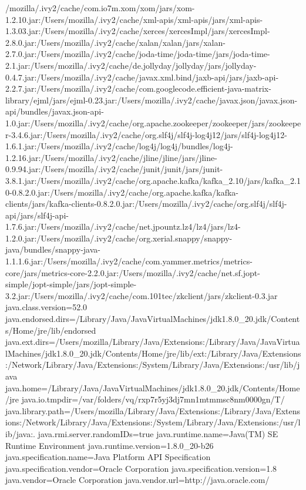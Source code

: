 /mozilla/.ivy2/cache/com.io7m.xom/xom/jars/xom-1.2.10.jar:/Users/mozilla/.ivy2/cache/xml-apis/xml-apis/jars/xml-apis-1.3.03.jar:/Users/mozilla/.ivy2/cache/xerces/xercesImpl/jars/xercesImpl-2.8.0.jar:/Users/mozilla/.ivy2/cache/xalan/xalan/jars/xalan-2.7.0.jar:/Users/mozilla/.ivy2/cache/joda-time/joda-time/jars/joda-time-2.1.jar:/Users/mozilla/.ivy2/cache/de.jollyday/jollyday/jars/jollyday-0.4.7.jar:/Users/mozilla/.ivy2/cache/javax.xml.bind/jaxb-api/jars/jaxb-api-2.2.7.jar:/Users/mozilla/.ivy2/cache/com.googlecode.efficient-java-matrix-library/ejml/jars/ejml-0.23.jar:/Users/mozilla/.ivy2/cache/javax.json/javax.json-api/bundles/javax.json-api-1.0.jar:/Users/mozilla/.ivy2/cache/org.apache.zookeeper/zookeeper/jars/zookeeper-3.4.6.jar:/Users/mozilla/.ivy2/cache/org.slf4j/slf4j-log4j12/jars/slf4j-log4j12-1.6.1.jar:/Users/mozilla/.ivy2/cache/log4j/log4j/bundles/log4j-1.2.16.jar:/Users/mozilla/.ivy2/cache/jline/jline/jars/jline-0.9.94.jar:/Users/mozilla/.ivy2/cache/junit/junit/jars/junit-3.8.1.jar:/Users/mozilla/.ivy2/cache/org.apache.kafka/kafka_2.10/jars/kafka_2.10-0.8.2.0.jar:/Users/mozilla/.ivy2/cache/org.apache.kafka/kafka-clients/jars/kafka-clients-0.8.2.0.jar:/Users/mozilla/.ivy2/cache/org.slf4j/slf4j-api/jars/slf4j-api-1.7.6.jar:/Users/mozilla/.ivy2/cache/net.jpountz.lz4/lz4/jars/lz4-1.2.0.jar:/Users/mozilla/.ivy2/cache/org.xerial.snappy/snappy-java/bundles/snappy-java-1.1.1.6.jar:/Users/mozilla/.ivy2/cache/com.yammer.metrics/metrics-core/jars/metrics-core-2.2.0.jar:/Users/mozilla/.ivy2/cache/net.sf.jopt-simple/jopt-simple/jars/jopt-simple-3.2.jar:/Users/mozilla/.ivy2/cache/com.101tec/zkclient/jars/zkclient-0.3.jar
java.class.version=52.0
java.endorsed.dirs=/Library/Java/JavaVirtualMachines/jdk1.8.0_20.jdk/Contents/Home/jre/lib/endorsed
java.ext.dirs=/Users/mozilla/Library/Java/Extensions:/Library/Java/JavaVirtualMachines/jdk1.8.0_20.jdk/Contents/Home/jre/lib/ext:/Library/Java/Extensions:/Network/Library/Java/Extensions:/System/Library/Java/Extensions:/usr/lib/java
java.home=/Library/Java/JavaVirtualMachines/jdk1.8.0_20.jdk/Contents/Home/jre
java.io.tmpdir=/var/folders/vq/rxp7r5yj3dj7mn1mtmmsc8nm0000gn/T/
java.library.path=/Users/mozilla/Library/Java/Extensions:/Library/Java/Extensions:/Network/Library/Java/Extensions:/System/Library/Java/Extensions:/usr/lib/java:.
java.rmi.server.randomIDs=true
java.runtime.name=Java(TM) SE Runtime Environment
java.runtime.version=1.8.0_20-b26
java.specification.name=Java Platform API Specification
java.specification.vendor=Oracle Corporation
java.specification.version=1.8
java.vendor=Oracle Corporation
java.vendor.url=http://java.oracle.com/
